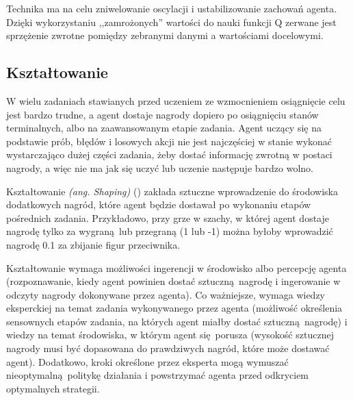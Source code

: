 Technika ma na celu zniwelowanie oscylacji i ustabilizowanie zachowań agenta. Dzięki wykorzystaniu ,,zamrożonych'' wartości do nauki funkcji Q zerwane jest sprzężenie zwrotne pomiędzy zebranymi danymi a wartościami docelowymi.

\subsection{Kształtowanie}\label{shaping}
W wielu zadaniach stawianych przed uczeniem ze wzmocnieniem osiągnięcie celu jest bardzo trudne, a agent dostaje nagrody dopiero po osiągnięciu stanów terminalnych, albo na zaawansowanym etapie zadania. Agent uczący się na podstawie prób, błędów i losowych akcji nie jest najczęściej w stanie wykonać wystarczająco dużej części zadania, żeby dostać informację zwrotną w postaci nagrody, a więc nie ma jak się uczyć lub uczenie następuje bardzo wolno.

Kształtowanie \textit{(ang. Shaping)} (\cite{Mataric94rewardfunctions}) zakłada sztuczne wprowadzenie do środowiska dodatkowych nagród, które agent będzie dostawał po wykonaniu etapów pośrednich zadania. Przykładowo, przy grze w szachy, w której agent dostaje nagrodę tylko za wygraną lub przegraną (1 lub -1) można byłoby wprowadzić nagrodę 0.1 za zbijanie figur przeciwnika.

Kształtowanie wymaga możliwości ingerencji w środowisko albo percepcję agenta (rozpoznawanie, kiedy agent powinien dostać sztuczną nagrodę i ingerowanie w odczyty nagrody dokonywane przez agenta). Co ważniejsze, wymaga wiedzy eksperckiej na temat zadania wykonywanego przez agenta (możliwość określenia sensownych etapów zadania, na których agent miałby dostać sztuczną nagrodę) i wiedzy na temat środowiska, w którym agent się porusza (wysokość sztucznej nagrody musi być dopasowana do prawdziwych nagród, które może dostawać agent). Dodatkowo, kroki określone przez eksperta mogą wymuszać nieoptymalną politykę działania i powstrzymać agenta przed odkryciem optymalnych strategii.
